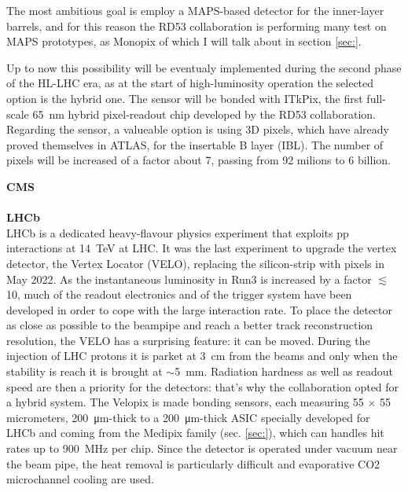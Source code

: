         The most ambitious goal is employ a MAPS-based detector for the inner-layer barrels, and for this reason the RD53 collaboration is performing many test on MAPS prototypes, as Monopix of which I will talk about in section \ref{sec:}.
        
        Up to now this possibility will be eventualy implemented during the second phase of the HL-LHC era, as at the start of high-luminosity operation the selected option is the hybrid one. The sensor will be bonded with ITkPix, the first full-scale \SI{65}{nm} hybrid pixel-readout chip developed by the RD53 collaboration.
        Regarding the sensor, a valueable option is using 3D pixels, which have already proved themselves in ATLAS, for the insertable B layer (IBL).
        The number of pixels will be increased of a factor about 7, passing from 92 milions to 6 billion.
    
        \vspace{5mm}
        \textbf{CMS}\\
        \\
        \vspace{5mm}
        \textbf{LHCb} \\
        LHCb is a dedicated heavy-flavour physics experiment that exploits pp interactions at \SI{14}{TeV} at LHC. 
        It was the last experiment to upgrade the vertex detector, the Vertex Locator (VELO), replacing the silicon-strip with pixels in May 2022. 
        As the instantaneous luminosity in Run3 is increased by a factor $\lesssim$10, much of the readout electronics and of the trigger system have been developed in order to cope with the large interaction rate.
        To place the detector as close as possible to the beampipe and reach a better track reconstruction resolution, the VELO has a surprising feature: it can be moved. During the injection of LHC protons it is parket at \SI{3}{cm} from the beams and only when the stability is reach it is brought at $\sim$\SI{5}{mm}. Radiation hardness as well as readout speed are then a priority for the detectors: that's why the collaboration opted for a hybrid system. 
        The Velopix is made bonding sensors, each measuring 55 $\times$ 55 micrometers, \SI{200}{\um}-thick to a \SI{200}{\um}-thick ASIC specially developed for LHCb and coming from the Medipix family (sec. \ref{sec:}), which can handles hit rates up to \SI{900}{MHz} per chip.
        Since the detector is operated under vacuum near the beam pipe, the heat removal is particularly difficult and evaporative CO2 microchannel cooling are used. 

